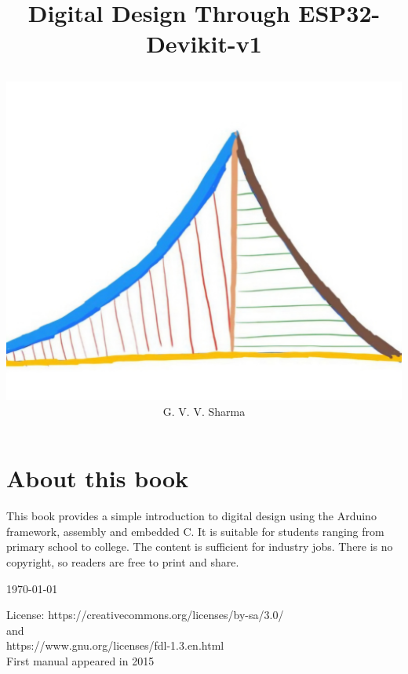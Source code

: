 \documentclass[journal]{IEEEtran}
\begin{document}

\onecolumn


\title{
	\begin{center}
Digital Design Through ESP32-Devikit-v1
\end{center}
}
\author{
\vspace{11cm}
	\begin{center}
\includegraphics[width=0.2\columnwidth]{figs/logo.jpg}
\\
		{\huge	G. V. V. Sharma}
	\end{center}
}
\maketitle

\newpage

\section*{About this book}
This book provides a simple introduction to digital design using the Arduino framework, assembly and embedded C.  It is suitable for students ranging from primary school to college.  The content is sufficient for  industry jobs.
There is no copyright, so readers are free to print and share.


\begin{flushright}
	\today
\end{flushright}
License: https://creativecommons.org/licenses/by-sa/3.0/
\\
and
\\
https://www.gnu.org/licenses/fdl-1.3.en.html
\\
First manual appeared in 2015

\newpage
\tableofcontents
\end{document}
